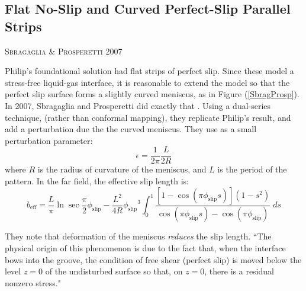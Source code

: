 \documentclass[12pt, a4paper, twoside, openright]{book}
\newcommand{\beff}{\ensuremath{b_{\mathrm{eff}}}}
\newcommand{\phislip}{\ensuremath{\phi_{\mathrm{slip}}}}
\newcommand{\paper}[1]
         {\colorbox[gray]{0.8}{ \textsc{#1}}
         
         }
\begin{document}
\clearpage
\subsection{Flat No-Slip and Curved Perfect-Slip Parallel Strips}

\paper{Sbragaglia \& Prosperetti 2007}
Philip's foundational solution had flat strips of perfect slip.  Since these model a stress-free liquid-gas interface, it is reasonable to extend the model so that the perfect slip surface forms a slightly curved meniscus, as in Figure (\ref{SbragProsp}).  In 2007, Sbragaglia and Prosperetti did exactly that \cite{SbragagliaProsperetti2007}.  Using a dual-series technique, (rather than conformal mapping), they replicate Philip's result, and add a perturbation due the the curved meniscus.  They use as a small perturbation parameter:
\begin{equation}
\epsilon = \frac{1}{2\pi} \frac{L}{2R} 
\end{equation}
where $R$ is the radius of curvature of the meniscus, and $L$ is the period of the pattern.  In the far field, the effective slip length is:
\begin{equation}
\beff= \frac{L}{\pi}	\ln \sec \frac{\pi}{2} \phislip - \frac{L^2}{4R}\phislip^3 \int_0^1 
\frac{[1-\cos(\pi\phislip s)] (1-s^2) }{\cos(\pi\phislip s) - \cos(\pi\phislip)}
\; ds
\end{equation}

They note that deformation of the meniscus \emph{reduces} the slip length. ``The physical origin of this phenomenon is due to the fact that, when the interface bows into the groove, the condition of free shear (perfect slip) is moved below the level $z=0$ of the undisturbed surface so that, on $z=0$, there is a residual nonzero stress."
\end{document}
